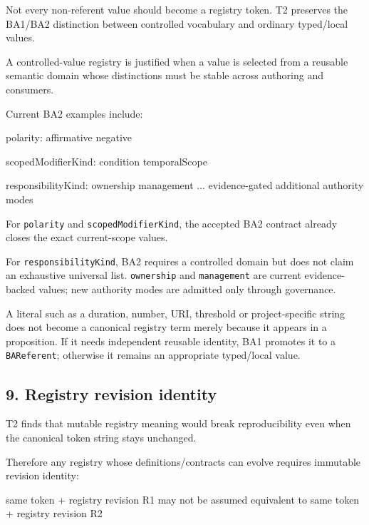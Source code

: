 \documentclass[
  10pt,
  a4paper,
]{article}
\newenvironment{Shaded}{}{}
\newcommand{\NormalTok}[1]{#1}
\begin{document}
Not every non-referent value should become a registry token. T2
preserves the BA1/BA2 distinction between controlled vocabulary and
ordinary typed/local values.

A controlled-value registry is justified when a value is selected from a
reusable semantic domain whose distinctions must be stable across
authoring and consumers.

Current BA2 examples include:

\begin{Shaded}
\begin{Highlighting}[]
\NormalTok{polarity:}
\NormalTok{  affirmative}
\NormalTok{  negative}

\NormalTok{scopedModifierKind:}
\NormalTok{  condition}
\NormalTok{  temporalScope}

\NormalTok{responsibilityKind:}
\NormalTok{  ownership}
\NormalTok{  management}
\NormalTok{  ... evidence{-}gated additional authority modes}
\end{Highlighting}
\end{Shaded}

For \texttt{polarity} and \texttt{scopedModifierKind}, the accepted BA2
contract already closes the exact current-scope values.

For \texttt{responsibilityKind}, BA2 requires a controlled domain but
does not claim an exhaustive universal list. \texttt{ownership} and
\texttt{management} are current evidence-backed values; new authority
modes are admitted only through governance.

A literal such as a duration, number, URI, threshold or project-specific
string does not become a canonical registry term merely because it
appears in a proposition. If it needs independent reusable identity, BA1
promotes it to a \texttt{BAReferent}; otherwise it remains an
appropriate typed/local value.

\subsection{9. Registry revision
identity}\label{registry-revision-identity}

T2 finds that mutable registry meaning would break reproducibility even
when the canonical token string stays unchanged.

Therefore any registry whose definitions/contracts can evolve requires
immutable revision identity:

\begin{Shaded}
\begin{Highlighting}[]
\NormalTok{same token}
\NormalTok{+ registry revision R1}
\NormalTok{    may not be assumed equivalent to}
\NormalTok{same token}
\NormalTok{+ registry revision R2}
\end{Highlighting}
\end{Shaded}
\end{document}
